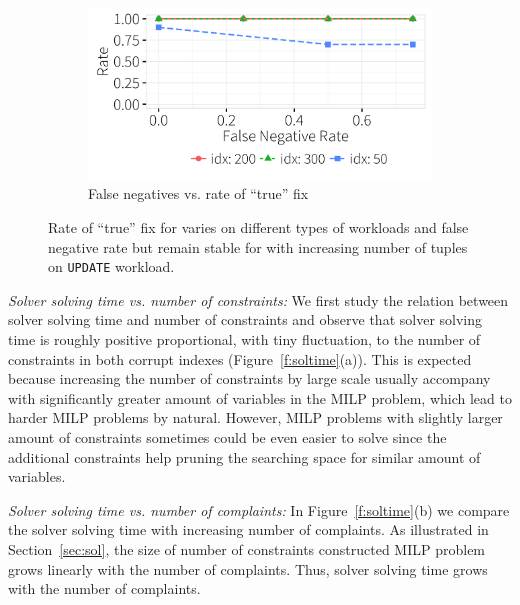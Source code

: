\begin{figure}[ht]
\begin{subfigure} [t]{.3\textwidth}
    \vspace*{-.1in}
    \label{f:heuristic_acc} 
    \end{subfigure}
    \begin{subfigure} [t]{.3\textwidth}
    \includegraphics[width = .99\columnwidth]{figures/noise_fn_acc_idx}
    \vspace*{-.25in}
    \caption{False negatives vs. rate of ``true'' fix}
    \vspace*{-.1in}
    \label{f:heuristic_time} 
    \end{subfigure}
   \caption{Rate of ``true'' fix for \sys varies on different types of workloads and false negative rate but remain 
   stable for with increasing number of tuples on \texttt{UPDATE} workload.}
   \vspace*{-.1in}
   \label{fig:truerate}
  \end{figure}

\smallskip
\emph{Solver solving time vs. number of constraints: } We first study the relation between solver solving time and number of constraints and observe that solver solving time is roughly positive proportional, with tiny fluctuation, to the number of constraints in both corrupt indexes (Figure~\ref{f:soltime}(a)). This is expected because increasing the number of constraints by large scale usually accompany with significantly greater amount of variables in the MILP problem, which lead to harder MILP problems by natural. However, MILP problems with slightly larger amount of constraints sometimes could be even easier to solve since the additional constraints help pruning the searching space for similar amount of variables.

\smallskip
\emph{Solver solving time vs. number of complaints: } In Figure~\ref{f:soltime}(b) we compare the solver solving 
time with increasing number of complaints. As illustrated in Section~\ref{sec:sol}, 
the size of number of constraints constructed MILP problem grows linearly with the number of complaints. Thus, solver solving time grows with the number of complaints. 



